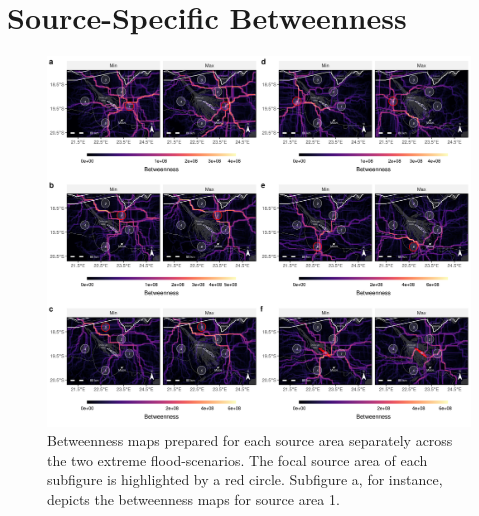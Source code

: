 \documentclass[../FinalThesis.tex]{subfiles}
\begin{document}
\section{Source-Specific Betweenness}
\begin{figure}[!ht]
  \begin{center}
  \includegraphics[width = \textwidth]{Figures/BetweennessIndividual.png}
  \caption{Betweenness maps prepared for each source area separately across the
  two extreme flood-scenarios. The focal source area of each subfigure is
  highlighted by a red circle. Subfigure a, for instance, depicts the
  betweenness maps for source area 1.}
  \label{BetweennessInd}
  \end{center}
\end{figure}

\newpage
\end{document}
